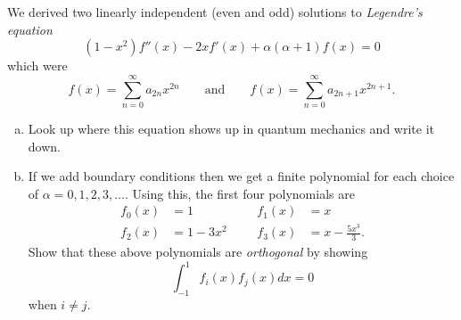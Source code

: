 \documentclass[12pt]{article} %
\begin{document}
\begin{problem}
We derived two linearly independent (even and odd) solutions to \emph{Legendre's equation}
\[
(1-x^2)f''(x)-2xf'(x)+\alpha(\alpha+1)f(x)=0
\]
which were
\[
f(x)=\sum_{n=0}^\infty a_{2n}x^{2n} \qquad \textrm{and} \qquad f(x)=\sum_{n=0}^\infty a_{2n+1}x^{2n+1}.
\]
\begin{enumerate}[(a)]
    \item Look up where this equation shows up in quantum mechanics and write it down.
    \item If we add boundary conditions then we get a finite polynomial for each choice of $\alpha = 0,1,2,3,\dots$. Using this, the first four polynomials are
    \begin{align*}
        f_0(x)&=1 &&& f_1(x)&=x\\
        f_2(x)&=1-3x^2 &&& f_3(x)&=x-\frac{5x^3}{3}.
    \end{align*}
    Show that these above polynomials are \emph{orthogonal} by showing
    \[
    \int_{-1}^1 f_i(x)f_j(x)dx = 0 
    \]
    when $i\neq j$.
\end{enumerate}
\end{problem}
\end{document}
